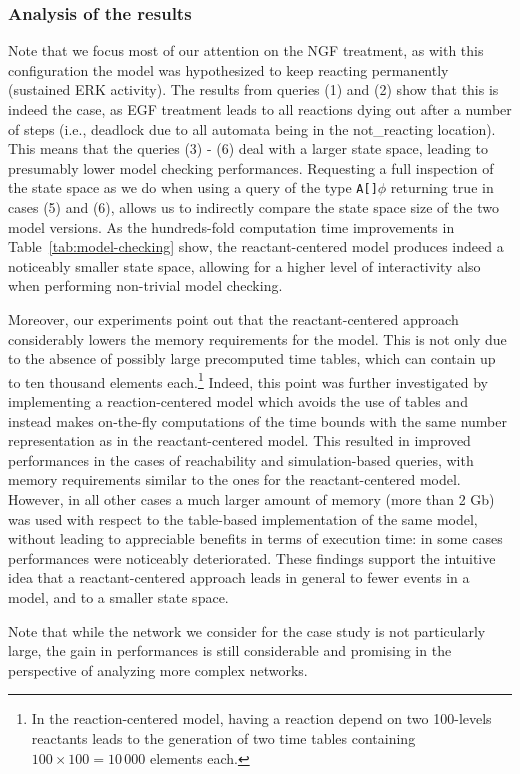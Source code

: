 \documentclass{bmcart}
\begin{document}
\subsubsection*{Analysis of the results}
Note that we focus most of our attention on the NGF treatment, as with this configuration the model
was hypothesized to keep reacting permanently (sustained ERK activity). The results from queries (1) and (2)
show that this is indeed the case, as EGF treatment leads to all reactions dying out after a number of steps (i.e., deadlock due to all
automata being in the {\sf not\_reacting} location).
This means that the queries (3) - (6) deal with a larger state space, leading to presumably lower model checking performances.
Requesting a full inspection of the state space
as we do when using a query of the type {\tt A[]$\phi$} returning true in cases (5) and (6), allows us to indirectly compare the state space size of the two
model versions. As the hundreds-fold computation time improvements in Table~\ref{tab:model-checking} show, the reactant-centered model produces
indeed a noticeably smaller state space, allowing for a higher level of interactivity also when performing non-trivial model checking.

Moreover, our experiments point out that the reactant-centered approach considerably lowers the memory
requirements for the model. This is not only due to the absence of possibly large precomputed time tables,
which can contain up to ten thousand elements each.\footnote{In the reaction-centered model, having a reaction depend on two 100-levels reactants
leads to the generation of two time tables containing $100 \times 100 = 10\,{}000$ elements each.}
Indeed, this point was further investigated by implementing a reaction-centered model which
avoids the use of tables and instead makes on-the-fly computations of the time bounds with the same number representation as in the reactant-centered model.
This resulted in improved performances in the cases of reachability and simulation-based queries, with memory requirements similar to the ones for
the reactant-centered model. However, in all other cases a much larger amount of memory (more than 2 Gb) was used
with respect to the table-based implementation of the same model, without leading to appreciable benefits in terms of execution time:
in some cases performances were noticeably deteriorated. These findings support the intuitive idea that a reactant-centered approach
leads in general to fewer events in a model, and to a smaller state space.

Note that while the network we consider for the case study is not particularly large, the gain in performances is still considerable
and promising in the perspective of analyzing more complex networks.
\end{document}
